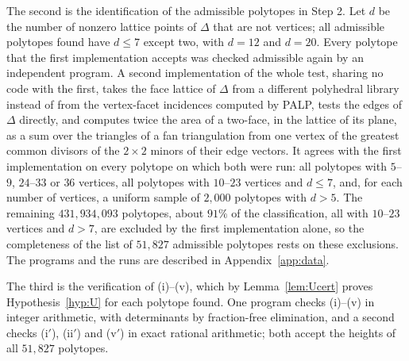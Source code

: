 The second is the identification of the admissible polytopes in Step 2. Let $d$ be the number of nonzero lattice points of
$\Delta$ that are not vertices; all admissible polytopes found have $d\le7$ except two, with $d=12$ and $d=20$. Every
polytope that the first implementation accepts was checked admissible again by an independent program. A second
implementation of the whole test, sharing no code with the first, takes the face lattice of $\Delta$ from a different polyhedral
library instead of from the vertex-facet incidences computed by PALP, tests the edges of $\Delta$ directly, and computes
twice the area of a two-face, in the lattice of its plane, as a sum over the triangles of a fan triangulation from one
vertex of the greatest common divisors of the $2\times2$ minors of their edge vectors. It agrees with the first
implementation on every polytope on which both were run: all polytopes with $5$--$9$, $24$--$33$ or $36$ vertices, all polytopes with $10$--$23$ vertices and $d\le7$, and,
for each number of vertices, a uniform sample of $2{,}000$ polytopes with $d>5$. The remaining $431{,}934{,}093$ polytopes,
about $91\%$ of the classification, all with $10$--$23$ vertices and $d>7$, are excluded by the first implementation
alone, so the completeness of the list of $51{,}827$ admissible polytopes rests on these exclusions. The programs and the
runs are described in Appendix~\ref{app:data}.

The third is the verification of (i)--(v), which by Lemma~\ref{lem:Ucert} proves Hypothesis~\ref{hyp:U} for each
polytope found. One program checks (i)--(v) in integer arithmetic, with determinants by fraction-free elimination, and a
second checks (i$'$), (ii$'$) and (v$'$) in exact rational arithmetic; both accept the heights of all $51{,}827$
polytopes.
